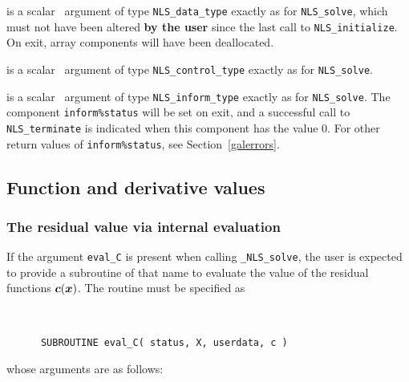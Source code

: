 \documentclass{galahad}
\newcommand{\packagename}{NLS}
\newcommand{\fullpackagename}{\libraryname\_\packagename}
\newcommand{\solver}{{\tt \fullpackagename\_solve}}
\begin{document}
\vspace*{-1mm}
\begin{description}

 is a scalar \intentinout\ argument of type
{\tt \packagename\_data\_type}
exactly as for
{\tt \packagename\_solve},
which must not have been altered {\bf by the user} since the last call to
{\tt \packagename\_initialize}.
On exit, array components will have been deallocated.

 is a scalar \intentin\ argument of type
{\tt \packagename\_control\_type}
exactly as for
{\tt \packagename\_solve}.

 is a scalar \intentout\ argument of type
{\tt \packagename\_inform\_type}
exactly as for
{\tt \packagename\_solve}.
The component {\tt inform\%status} will be set on exit, and a
successful call to
{\tt \packagename\_terminate}
is indicated when this  component has the value 0.
For other return values of {\tt inform\%status}, see Section~\ref{galerrors}.

\end{description}


\subsection{Function and derivative values\label{fdv}}


\subsubsection{The residual value via internal evaluation\label{rfv}}

If the argument {\tt eval\_C} is present when calling \solver, the
user is expected to provide a subroutine of that name to evaluate the
value of the residual functions ${\bm{c}}({\bm{x}})$.
The routine must be specified as

\def\baselinestretch{0.8}
{\tt
\begin{verbatim}
      SUBROUTINE eval_C( status, X, userdata, c )
\end{verbatim}
}
\def\baselinestretch{1.0}
\noindent whose arguments are as follows:
\end{document}
